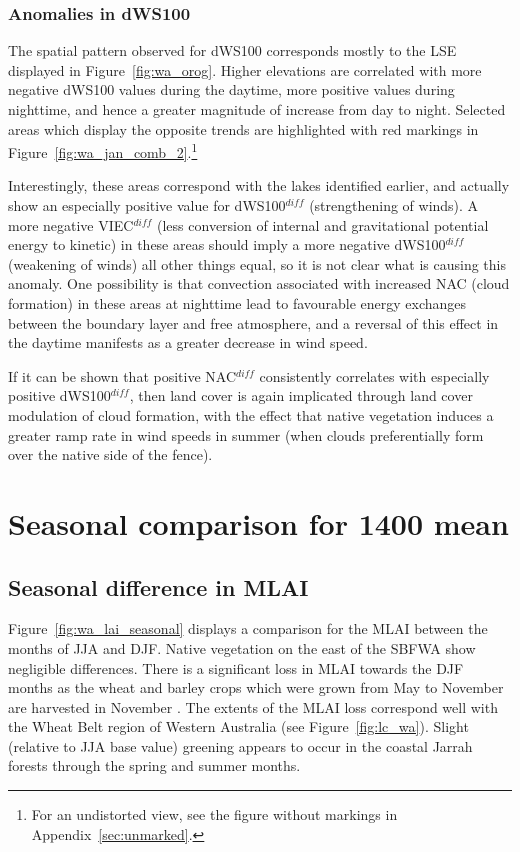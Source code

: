 \subsubsection{Anomalies in dWS100}

The spatial pattern observed for \acs{dWS100} corresponds mostly to the \ac{LSE} displayed in Figure~\ref{fig:wa_orog}. Higher elevations are correlated with more negative d\ac{WS100} values during the daytime, more positive values during nighttime, and hence a greater magnitude of increase from day to night. Selected areas which display the opposite trends are highlighted with red markings in Figure~\ref{fig:wa_jan_comb_2}.\footnote{For an undistorted view, see the figure without markings in Appendix~\ref{sec:unmarked}.}

Interestingly, these areas correspond with the lakes identified earlier, and actually show an especially positive value for \acs{dWS100}$^{diff}$ (strengthening of winds). A more negative \ac{VIEC}$^{diff}$ (less conversion of internal and gravitational potential energy to kinetic) in these areas should imply a more negative \acs{dWS100}$^{diff}$ (weakening of winds) all other things equal, so it is not clear what is causing this anomaly. One possibility is that convection associated with increased \ac{NAC} (cloud formation) in these areas at nighttime lead to favourable energy exchanges between the boundary layer and free atmosphere, and a reversal of this effect in the daytime manifests as a greater decrease in wind speed.

If it can be shown that positive \ac{NAC}$^{diff}$ consistently correlates with especially positive \ac{dWS100}$^{diff}$, then land cover is again implicated through land cover modulation of cloud formation, with the effect that native vegetation induces a greater ramp rate in wind speeds in summer (when clouds preferentially form over the native side of the fence).

\section{Seasonal comparison for 1400 mean}

\subsection{Seasonal difference in MLAI}

Figure~\ref{fig:wa_lai_seasonal} displays a comparison for the \acl{MLAI} between the months of \ac{JJA} and \ac{DJF}. Native vegetation on the east of the \ac{SBFWA} show negligible differences. There is a significant loss in \ac{MLAI} towards the \ac{DJF} months as the wheat and barley crops which were grown from May to November are harvested in November \citep{lyons1996}. The extents of the \ac{MLAI} loss correspond well with the Wheat Belt region of Western Australia (see Figure~\ref{fig:lc_wa}). Slight (relative to \ac{JJA} base value) greening appears to occur in the coastal Jarrah forests through the spring and summer months.

